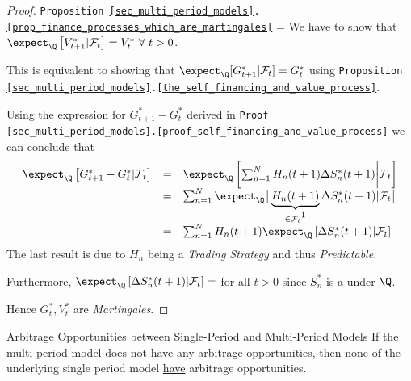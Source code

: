 \documentclass[11pt,a4paper]{article}
\begin{document}
  \begin{proof}{\texttt{Proposition \ref{sec_multi_period_models}.\ref{prop_finance_processes_which_are_martingales}}}
    \everymath={\displaystyle}
    We have to show that $\expect_\Q\left[V_{t+1}^*|\mathcal{F}_t\right]=V_t^*\ \forall\ t>0$.
    \par This is equivalent to showing that $\expect_\Q[G_{t+1}^*|\mathcal{F}_t]=G_t^*$ using \texttt{Proposition \ref{sec_multi_period_models}.\ref{the_self_financing_and_value_process}}.
    \par Using the expression for $G_{t+1}^*-G_t^*$ derived in \texttt{Proof \ref{sec_multi_period_models}.\ref{proof_self_financing_and_value_process}} we can conclude that
    \[\begin{array}{rcl}
      \expect_\Q\left[G_{t+1}^*-G_t^*|\mathcal{F}_t\right]&=&\expect_\Q\left[\sum_{n=1}^NH_n(t+1)\Delta S_n^*(t+1)\bigg|\mathcal{F}_t\right]\\
      &=&\sum_{n=1}^N\expect_\Q\big[\underbrace{H_n(t+1)}_{\in\mathcal{F}_t\footnotemark}\Delta S_n^*(t+1)|\mathcal{F}_t\big]\\
      &=&\sum_{n=1}^NH_n(t+1)\expect_\Q\left[\Delta S_n^*(t+1)|\mathcal{F}_t\right]
    \end{array}\]
    The last result is due to $H_n$ being a \textit{Trading Strategy} and thus \textit{Predictable}.
    \par Furthermore, $\expect_\Q\left[\Delta S_n^*(t+1)|\mathcal{F}_t\right]=$ for all $t>0$ since $S_n^*$ is a under $\Q$.
    \par Hence $G_t^*,V_t^*$ are \textit{Martingales}.\proved
  \end{proof}

  \begin{proposition}{Arbitrage Opportunities between Single-Period and Multi-Period Models}\label{prop_arbitrage_opportunities_single_and_multi_period_model}
    If the multi-period model does \underline{not} have any arbitrage opportunities, then none of the underlying single period model \underline{have} arbitrage opportunities.
  \end{proposition}
\end{document}
